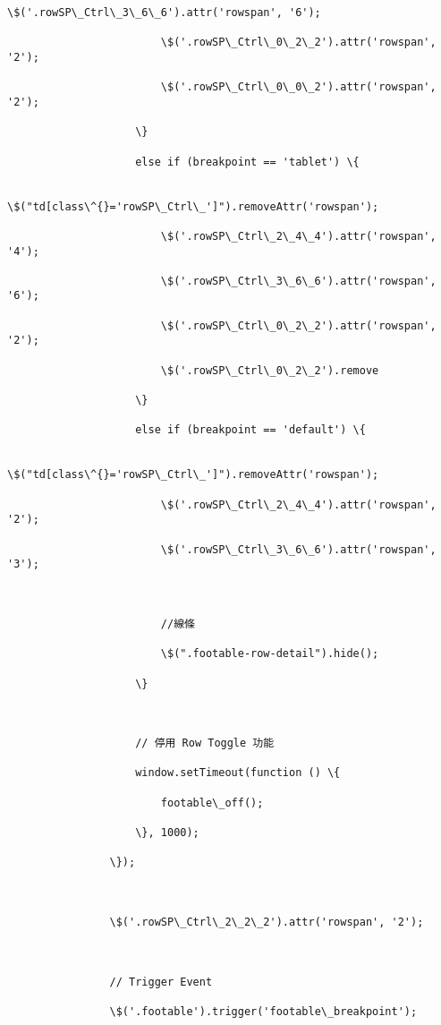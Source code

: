 \documentclass[11pt]{article}
\begin{document}
\begin{Verbatim}[commandchars=\\\{\}]
                        \$('.rowSP\_Ctrl\_3\_6\_6').attr('rowspan', '6');

                        \$('.rowSP\_Ctrl\_0\_2\_2').attr('rowspan', '2');

                        \$('.rowSP\_Ctrl\_0\_0\_2').attr('rowspan', '2');

                    \}

                    else if (breakpoint == 'tablet') \{

                        \$("td[class\^{}='rowSP\_Ctrl\_']").removeAttr('rowspan');

                        \$('.rowSP\_Ctrl\_2\_4\_4').attr('rowspan', '4');

                        \$('.rowSP\_Ctrl\_3\_6\_6').attr('rowspan', '6');

                        \$('.rowSP\_Ctrl\_0\_2\_2').attr('rowspan', '2');

                        \$('.rowSP\_Ctrl\_0\_2\_2').remove

                    \}

                    else if (breakpoint == 'default') \{

                        \$("td[class\^{}='rowSP\_Ctrl\_']").removeAttr('rowspan');

                        \$('.rowSP\_Ctrl\_2\_4\_4').attr('rowspan', '2');

                        \$('.rowSP\_Ctrl\_3\_6\_6').attr('rowspan', '3');



                        //線條

                        \$(".footable-row-detail").hide();

                    \}



                    // 停用 Row Toggle 功能

                    window.setTimeout(function () \{

                        footable\_off();

                    \}, 1000);

                \});



                \$('.rowSP\_Ctrl\_2\_2\_2').attr('rowspan', '2');



                // Trigger Event

                \$('.footable').trigger('footable\_breakpoint');




\end{Verbatim}
\end{document}
